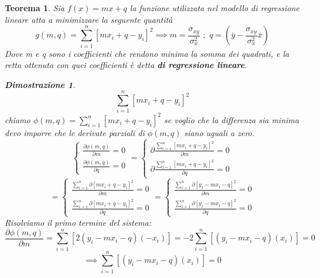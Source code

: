 \documentclass{article}
\newtheorem{teorema}{Teorema}[section]
\newtheorem{dimostrazione}{Dimostrazione}
\begin{document}
        \begin{teorema} Sia $f(x) = mx+q$ la funzione utilizzata nel modello di regressione lineare atta a minimizzare la seguente quantità $$g(m,q) = \sum_{i=1}^n\left[ mx_i+q -y_i\right]^2  \implies m=\frac{\sigma_{xy}}{\sigma^2_x} \,\,;\,\, q=(\bar{y}- \frac{\sigma_{xy}}{\sigma^2_x}\bar{x})$$
        Dove m e q sono i coefficienti che rendono minima la somma dei quadrati, e la retta ottenuta con quei coefficienti è detta \textbf{di regressione lineare}.
       \newpage
         \begin{dimostrazione}
         $$\sum_{i=1}^n\left[ mx_i+q -y_i\right]^2$$ chiamo 
         $\phi(m,q) = \sum_{i=1}^n\left[ mx_i+q -y_i\right]^2$ se voglio che la differenza sia minima devo imporre che le derivate parziali di $\phi(m,q)$ siano uguali a zero.
         $$
             \begin{cases}
                 \frac{\partial\phi(m,q)}{\partial m}=0\\
                  \frac{\partial\phi(m,q)}{\partial q}=0
            \end{cases}
            =  \begin{cases}
                 \partial\frac{\sum_{i=1}^n\left[ mx_i+q -y_i\right]^2}{\partial m}=0\\
                 \partial\frac{\sum_{i=1}^n\left[ mx_i+q -y_i\right]^2}{\partial q}=0
            \end{cases}
             $$
             $$
             =
             \begin{cases}
                 \frac{\sum_{i=1}^n\partial \left[ mx_i+q -y_i\right]^2}{\partial m}=0\\
                 \frac{\sum_{i=1}^n\partial\left[ mx_i+q -y_i\right]^2}{\partial q}=0
             \end{cases}
             = \begin{cases}
                 \frac{\sum_{i=1}^n\partial \left[ y_i - mx_i-q \right]^2}{\partial m}=0\\
                 \frac{\sum_{i=1}^n\partial\left[ y_i - mx_i-q\right]^2}{\partial q}=0
             \end{cases}
             $$
             Risolviamo il primo termine del sistema: 
             $$\frac{\partial\phi(m,q)}{\partial m} = \sum_{i=1}^{n} [2(y_i-mx_i-q)(-x_i)] =  -2\sum_{i=1}^{n} [(y_i-mx_i-q)(x_i)]=0 $$ 
             $$\implies\sum_{i=1}^{n} [(y_i-mx_i-q)(x_i)]=0 
             $$
             

\end{dimostrazione}
\end{teorema}
\end{document}
